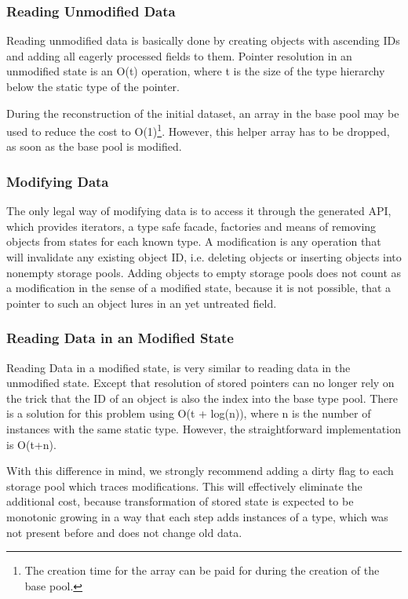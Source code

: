 \subsubsection{Reading Unmodified Data}

Reading unmodified data is basically done by creating objects with ascending IDs and adding all eagerly processed fields to them. Pointer resolution in an unmodified state is an O(t) operation, where t is the size of the type hierarchy below the static type of the pointer.

During the reconstruction of the initial dataset, an array in the base pool may be used to reduce the cost to O(1)\footnote{The creation time for the array can be paid for during the creation of the base pool.}. However, this helper array has to be dropped, as soon as the base pool is modified.


\subsubsection{Modifying Data}

The only legal way of modifying data is to access it through the generated API, which provides iterators, a type safe facade, factories and means of removing objects from states for each known type.
A modification is any operation that will invalidate any existing object ID, i.e. deleting objects or inserting objects into nonempty storage pools. Adding objects to empty storage pools does not count as a modification in the sense of a modified state, because it is not possible, that a pointer to such an object lures in an yet untreated field.


\subsubsection{Reading Data in an Modified State}

Reading Data in a modified state, is very similar to reading data in the unmodified state. Except that resolution of stored pointers can no longer rely on the trick that the ID of an object is also the index into the base type pool. There is a solution for this problem using O(t + log(n)), where n is the number of instances with the same static type. However, the straightforward implementation is O(t+n).

With this difference in mind, we strongly recommend adding a dirty flag to each storage pool which traces modifications. This will effectively eliminate the additional cost, because transformation of stored state is expected to be monotonic growing in a way that each step adds instances of a type, which was not present before and does not change old data.



